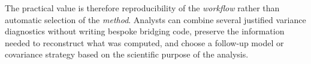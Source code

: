 The practical value is therefore reproducibility of the \emph{workflow} rather than
automatic selection of the \emph{method}. Analysts can combine several justified
variance diagnostics without writing bespoke bridging code, preserve the
information needed to reconstruct what was computed, and choose a follow-up
model or covariance strategy based on the scientific purpose of the analysis.



\address{%
Diogo Ribeiro\\
Faculty of Media Arts and Design, Technical University of Porto\\%
Vila do Conde, Portugal\\
%
\url{https://orcid.org/0009-0001-2022-7072}\\%
\textit{ORCiD: \href{https://orcid.org/0009-0001-2022-7072}{0009-0001-2022-7072}}\\%
\href{mailto:dfr@esmad.ipp.pt}{\nolinkurl{dfr@esmad.ipp.pt}}%
}
